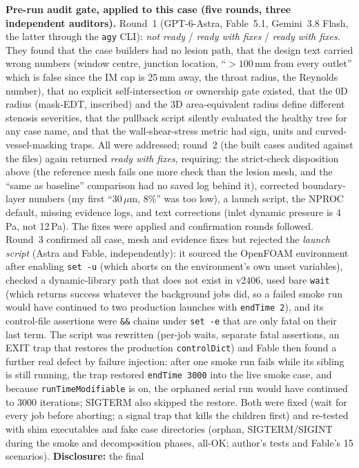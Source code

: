 \documentclass[11pt]{article}
\begin{document}
\textbf{Pre-run audit gate, applied to this case (five rounds, three independent auditors).} Round~1 (GPT-6-Astra, Fable~5.1, Gemini~3.8 Flash, the latter through the \texttt{agy} CLI):
\emph{not ready} / \emph{ready with fixes} / \emph{ready with fixes}. They found that the case builders had no lesion path, that the design text carried wrong numbers (window centre, junction location, ``$>100$\,mm from every outlet''
which is false since the IM cap is 25\,mm away, the throat radius, the Reynolds number), that no explicit self-intersection or ownership gate existed, that the 0D radius (mask-EDT, inscribed) and the 3D
area-equivalent radius define different stenosis severities, that the pullback script silently evaluated the healthy tree for any case name, and that the wall-shear-stress metric had sign, units and curved-vessel-masking traps.
All were addressed; round~2 (the built cases audited against the files) again returned \emph{ready with fixes}, requiring: the strict-check disposition above (the
reference mesh fails one more check than the lesion mesh, and the ``same as baseline'' comparison had no saved log behind it), corrected boundary-layer numbers (my first ``30\,$\mu$m, 8\%'' was too low), a launch script, the NPROC default, missing evidence logs, and text corrections (inlet dynamic pressure is 4\,Pa, not 12\,Pa). The fixes were applied
and confirmation rounds followed. Round~3 confirmed all case, mesh and evidence fixes but rejected the \emph{launch script} (Astra and Fable, independently): it sourced the OpenFOAM environment after enabling
\texttt{set -u} (which aborts on the environment's own unset variables), checked a dynamic-library path that does not exist in v2406, used bare \texttt{wait} (which returns success whatever the background jobs did, so a failed smoke run would have
continued to two production launches with \texttt{endTime 2}), and its control-file assertions were \texttt{\&\&} chains under \texttt{set -e} that are only fatal on their last term. The script was rewritten (per-job waits, separate fatal assertions,
an EXIT trap that restores the production \texttt{controlDict}) and Fable then found a further real defect by failure injection: after one smoke run fails while its sibling is still running, the trap restored \texttt{endTime 3000}
into the live smoke case, and because \texttt{runTimeModifiable} is on, the orphaned serial run would have continued to 3000 iterations; SIGTERM also skipped the restore. Both were fixed (wait for every job before aborting; a signal
trap that kills the children first) and re-tested with shim executables and fake case directories (orphan, SIGTERM/SIGINT during the smoke and decomposition phases, all-OK; author's tests and Fable's 15 scenarios). \textbf{Disclosure:} the final
\end{document}
